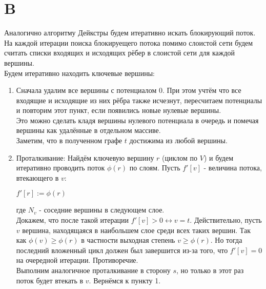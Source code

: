 \documentclass{article}
\begin{document}
    \section{B}
    Аналогично алгоритму Дейкстры будем итеративно искать блокирующий поток.\\
    На каждой итерации поиска блокируещего потока помимо слоистой сети будем считать
    списки входящих и исходящих рёбер в слоистой сети для каждой вершины.\\
    Будем итеративно находить ключевые вершины:
    \begin{enumerate}
    \item Сначала удалим все вершины с потенциалом 0. При этом учтём что все входящие и исходящие
    из них рёбра также исчезнут, пересчитаем потенциалы и повторим этот пункт, если появились
    новые нулевые вершины.\\
    Это можно сделать кладя вершины нулевого потенциала в очередь и помечая вершины как удалённые
    в отдельном массиве.\\
    Заметим, что в полученном графе $t$ достижима из любой вершины.
    \item Проталкивание: Найдём ключевую вершину $r$ (циклом по $V$) 
    и будем итеративно проводить поток $\phi(r)$ по слоям.
    Пусть $f'[v]$ - величина потока, втекающего в $v$:\\
        \begin{algorithm}[H]
            $f'[r] := \phi(r)$ \;
        \end{algorithm}
        где $N_v$ - соседние вершины в следующем слое.\\
        Докажем, что после такой итерации $f'[v] > 0 \leftrightarrow v = t$.
        Действительно, пусть $v$ вершина, находящаяся в наибольшем слое среди всех таких вершин.
        Так как $\phi(v) \geq \phi(r)$ в частности выходная степень $v \geq \phi(r)$. Но тогда последний вложенный цикл
        должен был завершится из-за того, что $f'[v] = 0$ на очередной итерации. Противоречие.\\
        Выполним аналогичное проталкивание в сторону $s$, но только в этот раз поток будет втекать в $v$.
        Вернёмся к пункту 1.
    \end{enumerate}
\end{document}

